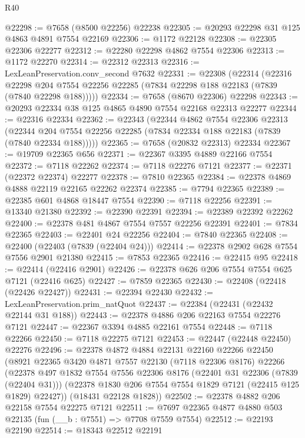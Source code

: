 \begin{lexlean}{R40}
\begin{coremodule}
@22298 := @7658 (@8500 @22256) @22238
@22305 := @20293 @22298 @31 @125 @4863 @4891 @7554 @22169
@22306 := @1172 @22128
@22308 := @22305 @22306 @22277
@22312 := @22280 @22298 @4862 @7554 @22306
@22313 := @1172 @22270
@22314 := @22312 @22313
@22316 := LexLeanPreservation.conv_second @7632
@22331 := @22308
    (@22314
      (@22316
        @22298
        @204
        @7554
        @22256
        @22285
        (@7834 @22298 @188 @22183 (@7839 (@7840 @22298 @188)))))
@22334 := @7658 (@8670 @22306) @22298
@22343 := @20293 @22334 @38 @125 @4865 @4890 @7554 @22168 @22313 @22277
@22344 := @22316 @22334
@22362 := @22343
    (@22344
      @4862
      @7554
      @22306
      @22313
      (@22344 @204 @7554 @22256 @22285 (@7834 @22334 @188 @22183 (@7839 (@7840 @22334 @188)))))
@22365 := @7658 (@20832 @22313) @22334
@22367 := @19709 @22365 @656
@22371 := @22367 @3395 @4889 @22166 @7554
@22372 := @7118 @22262
@22374 := @7118 @22276 @7121
@22377 := @22371 (@22372 @22374) @22277
@22378 := @7810 @22365
@22384 := @22378 @4869 @4888 @22119 @22165 @22262 @22374
@22385 := @7794 @22365
@22389 := @22385 @601 @4868 @18447 @7554
@22390 := @7118 @22256
@22391 := @13340 @21380
@22392 := @22390 @22391
@22394 := @22389 @22392 @22262
@22400 := @22378 @481 @4867 @7554 @7557 @22256 @22391
@22401 := @7834 @22365
@22403 := @22401 @24 @22256
@22404 := @7840 @22365
@22408 := @22400 (@22403 (@7839 (@22404 @24)))
@22414 := @22378 @2902 @628 @7554 @7556 @2901 @21380
@22415 := @7853 @22365
@22416 := @22415 @95
@22418 := @22414 (@22416 @2901)
@22426 := @22378 @626 @206 @7554 @7554 @625 @7121 (@22416 @625)
@22427 := @7859 @22365
@22430 := @22408 (@22418 (@22426 @22427))
@22431 := @22394 @22430
@22432 := LexLeanPreservation.prim_natQuot
@22437 := @22384 (@22431 (@22432 @22144 @31 @188))
@22443 := @22378 @4886 @206 @22163 @7554 @22276 @7121
@22447 := @22367 @3394 @4885 @22161 @7554
@22448 := @7118 @22266
@22450 := @7118 @22275 @7121
@22453 := @22447 (@22448 @22450) @22276
@22496 := @22378
    @4872
    @4884
    @22131
    @22160
    @22266
    @22450
    (@8921
      @22365
      @3420
      @4871
      @7557
      @22130
      (@7118 @22306 @8176)
      @22266
      (@22378
        @497
        @1832
        @7554
        @7556
        @22306
        @8176
        (@22401 @31 @22306 (@7839 (@22404 @31)))
        (@22378 @1830 @206 @7554 @7554 @1829 @7121 (@22415 @125 @1829) @22427))
      (@18431 @22128 @1828))
@22502 := @22378 @4882 @206 @22158 @7554 @22275 @7121
@22511 := @7697 @22365 @4877 @4880 @503 @22135 (fun (__b : @7551) => @7708 @7559 @7554)
@22512 := @22193 @22190
@22514 := @18343 @22512 @22191

\end{coremodule}
\end{lexlean}
